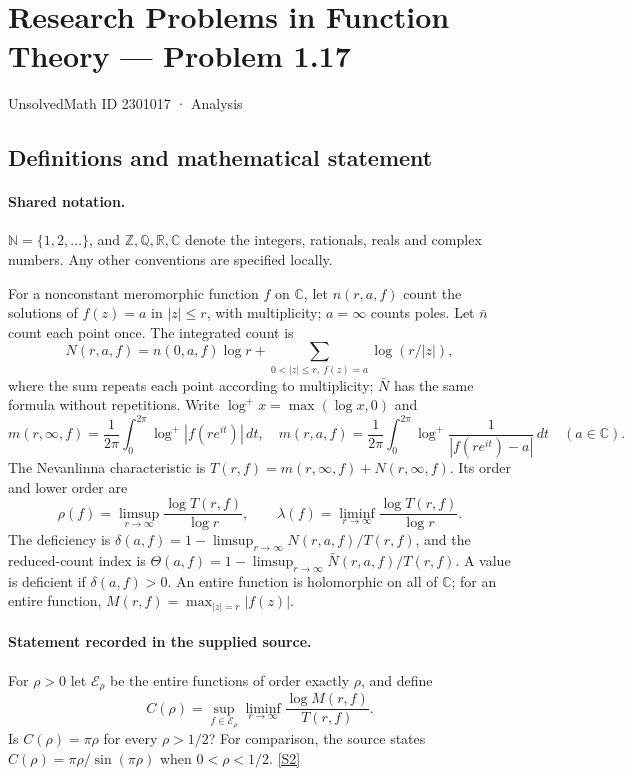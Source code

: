 \documentclass[11pt]{article}
\newcommand{\sref}[2]{\hyperlink{source:#1:#2}{[S#2]}}
\begin{document}
\setcounter{section}{2301016}
\section{Research Problems in Function Theory — Problem 1.17}\label{2301017}
{\small\sffamily UnsolvedMath ID 2301017 · Analysis}
\subsection{Definitions and mathematical statement}

\paragraph{Shared notation.}$\mathbb N=\{1,2,\ldots\}$, and $\mathbb Z,\mathbb Q,\mathbb R,\mathbb C$ denote the integers, rationals, reals and complex numbers. Any other conventions are specified locally.


For a nonconstant meromorphic function $f$ on $\mathbb C$, let $n(r,a,f)$ count the solutions of $f(z)=a$ in $|z|\le r$, with multiplicity; $a=\infty$ counts poles. Let $\bar n$ count each point once. The integrated count is
\[
 N(r,a,f)=n(0,a,f)\log r+\sum_{0<|z|\le r,\ f(z)=a}\log(r/|z|),
\]
where the sum repeats each point according to multiplicity; $\bar N$ has the same formula without repetitions. Write $\log^+x=\max(\log x,0)$ and
\[
 m(r,\infty,f)=\frac1{2\pi}\int_0^{2\pi}\log^+|f(re^{it})|\,dt,\quad
 m(r,a,f)=\frac1{2\pi}\int_0^{2\pi}\log^+\frac1{|f(re^{it})-a|}\,dt\quad(a\in\mathbb C).
\]
The Nevanlinna characteristic is $T(r,f)=m(r,\infty,f)+N(r,\infty,f)$. Its order and lower order are
\[
 \rho(f)=\limsup_{r\to\infty}\frac{\log T(r,f)}{\log r},\qquad
 \lambda(f)=\liminf_{r\to\infty}\frac{\log T(r,f)}{\log r}.
\]
The deficiency is $\delta(a,f)=1-\limsup_{r\to\infty}N(r,a,f)/T(r,f)$, and the reduced-count index is $\Theta(a,f)=1-\limsup_{r\to\infty}\bar N(r,a,f)/T(r,f)$. A value is deficient if $\delta(a,f)>0$. An entire function is holomorphic on all of $\mathbb C$; for an entire function, $M(r,f)=\max_{|z|=r}|f(z)|$.
\paragraph{Statement recorded in the supplied source.}
For $\rho>0$ let $\mathcal E_\rho$ be the entire functions of order exactly $\rho$, and define
\[
 C(\rho)=\sup_{f\in\mathcal E_\rho}\liminf_{r\to\infty}\frac{\log M(r,f)}{T(r,f)}.
\]
Is $C(\rho)=\pi\rho$ for every $\rho>1/2$? For comparison, the source states $C(\rho)=\pi\rho/\sin(\pi\rho)$ when $0<\rho<1/2$. \sref{2301017}{2}
\end{document}
